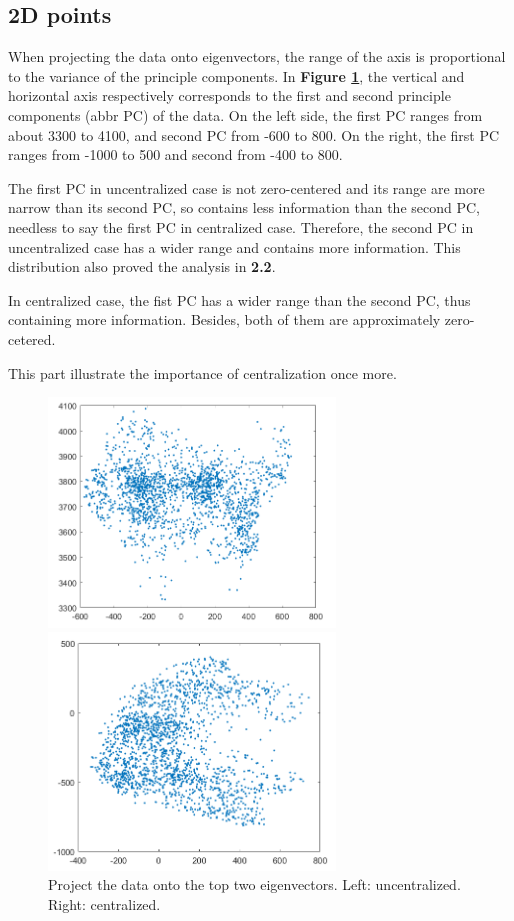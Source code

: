 \documentclass{article}
\begin{document}
\subsection{2D points}
When projecting the data onto eigenvectors, the range of the axis is proportional to the variance of the principle components. In \textbf{Figure \ref{fig12}}, the vertical and horizontal axis respectively corresponds to the first and second principle components (abbr PC) of the data. On the left side, the first PC ranges from about 3300 to 4100, and second PC from -600 to 800. On the right, the first PC ranges from -1000 to 500 and second from -400 to 800.\par
The first PC in uncentralized case is not zero-centered and its range are more narrow than its second PC, so contains less information than the second PC, needless to say the first PC in centralized case. Therefore, the second PC in uncentralized case has a wider range and contains more information. This distribution also proved the analysis in \textbf{2.2}.\par
In centralized case, the fist PC has a wider range than the second PC, thus containing more information. Besides, both of them are approximately zero-cetered.\par
This part illustrate the importance of centralization once more.

\begin{figure}[H]
\begin{minipage}[t]{0.5\linewidth}
\centering
\includegraphics[width=3in]{figure12_1}
\end{minipage}%
\begin{minipage}[t]{0.5\linewidth}
\centering
\includegraphics[width=3in]{figure12_2}
\end{minipage}
\caption{Project the data onto the top two eigenvectors. Left: uncentralized. Right: centralized.}
\label{fig12}
\end{figure}
\end{document}
